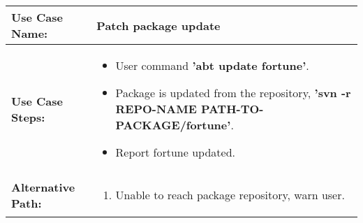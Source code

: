 \medskip

\begin{tabularx}{\linewidth}{|l|X|}
\hline
\textbf{Use Case Name:} & \textbf{Patch package update} \\
\hline
\textbf{Use Case Steps:} & 
\begin{minipage}{\linewidth} 
  \vspace{0.05em}
  \begin{itemize}
    \item User command \textbf{'abt update fortune'}.
    \item Package is updated from the repository, \textbf{'svn -r REPO-NAME PATH-TO-PACKAGE/fortune'}.
    \item Report fortune updated.
  \end{itemize}
  \vspace{0.05em}
\end{minipage}
\\
\hline 
\textbf{Alternative Path:} &
\begin{minipage}{\linewidth}
  \vspace{0.05em} 
  \begin{enumerate}
    \item Unable to reach package repository, warn user.
  \end{enumerate}
  \vspace{0.05em} 
\end{minipage}
\\
\hline
\end{tabularx}